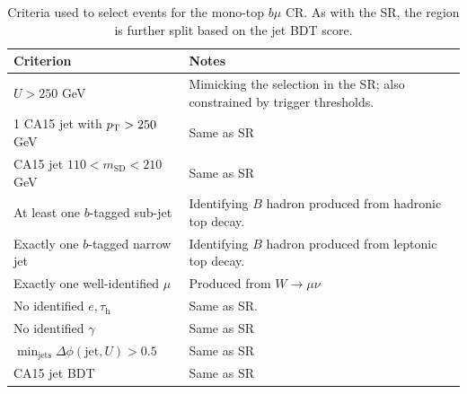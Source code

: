 \begin{table}[]
    \caption{Criteria used to select events for the mono-top $b\mu$ CR. As with the SR, the region is further split based on the jet BDT score.}
    \label{tab:mt:tmn_cuts}
    \centering
    \begin{tabular}{p{}p{}}
        Criterion & Notes \\
        \hline
        \hline
        $U>250$ GeV & Mimicking the selection in the SR; also constrained by trigger thresholds. \\
        1 CA15 jet with $p_\mathrm{T}>250$ GeV &  Same as SR \\
        CA15 jet $110 < m_\mathrm{SD} < 210$ GeV & Same as SR \\
        At least one $b$-tagged sub-jet & Identifying $B$ hadron produced from hadronic top decay. \\
        Exactly one $b$-tagged narrow jet & Identifying $B$ hadron produced from leptonic top decay. \\
        \hline
        Exactly one well-identified $\mu$ & Produced from $W\rightarrow\mu\nu$ \\
        No identified $e,\tau_\mathrm{h}$ & Same as SR. \\
        No identified $\gamma$ & Same as SR \\
        \hline
        $\min_\mathrm{jets}\Delta\phi(\mathrm{jet},U) > 0.5$ & Same as SR \\
        \hline
        CA15 jet BDT & Same as SR\\
    \end{tabular}
\end{table}

